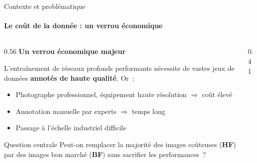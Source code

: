 \documentclass[aspectratio=169, 10pt]{beamer}
\begin{document}
\begin{frame}{Contexte et probl\'{e}matique}
\framesubtitle{Le co\^{u}t de la donn\'{e}e : un verrou \'{e}conomique}
  \begin{columns}[T]
    \begin{column}{0.56\textwidth}
      \textbf{\color{primary}Un verrou \'{e}conomique majeur}

      \smallskip
      L'entra\^{i}nement de r\'{e}seaux profonds performants n\'{e}cessite de vastes jeux de donn\'{e}es \textbf{annot\'{e}s de haute qualit\'{e}}. Or~:

      \medskip
      \begin{itemize}\setlength\itemsep{5pt}
        \item Photographe professionnel, \'{e}quipement haute r\'{e}solution $\Rightarrow$ co\^{u}t \'{e}lev\'{e}
        \item Annotation manuelle par experts $\Rightarrow$ temps long
        \item Passage \`{a} l'\'{e}chelle industriel difficile
      \end{itemize}

      \vspace{0.2cm}
      \begin{alertblock}{Question centrale}
        Peut-on remplacer la majorit\'{e} des images co\^{u}teuses (\textbf{HF}) par des images bon march\'{e} (\textbf{BF}) sans sacrifier les performances~?
      \end{alertblock}
    \end{column}
    \begin{column}{0.41\textwidth}
      \centering
\end{column}
\end{columns}
\end{frame}
\end{document}
